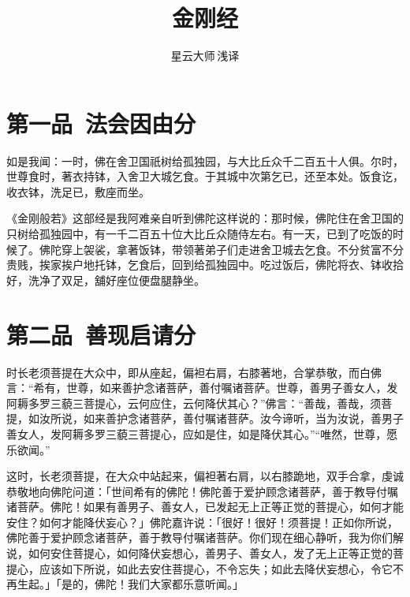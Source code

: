 \documentclass[12pt,twoside,openany]{book}
\title{金刚经}
\author{星云大师\,浅译}
\date{ }
\newcommand{\kai}[1]{{\CJKfamily{kai}#1}}
\begin{document}

\maketitle
\tableofcontents

\noindent
\chapter{第一品\ 法会因由分}

如是我闻：一时，佛在舍卫国祇树给孤独园，与大比丘众千二百五十人俱。尔时，世尊食时，著衣持钵，入舍卫大城乞食。于其城中次第乞已，还至本处。饭食讫，收衣钵，洗足已，敷座而坐。

\kai{《金刚般若》这部经是我阿难亲自听到佛陀这样说的：那时候，佛陀住在舍卫国的只树给孤独园中，有一千二百五十位大比丘众随侍左右。有一天，已到了吃饭的时候了。佛陀穿上袈裟，拿著饭钵，带领著弟子们走进舍卫城去乞食。不分贫富不分贵贱，挨家挨户地托钵，乞食后，回到给孤独园中。吃过饭后，佛陀将衣、钵收拾好，洗净了双足，舖好座位便盘腿静坐。}

\chapter{第二品\ 善现启请分}

时长老须菩提在大众中，即从座起，偏袒右肩，右膝著地，合掌恭敬，而白佛言：“希有，世尊，如来善护念诸菩萨，善付嘱诸菩萨。世尊，善男子善女人，发阿耨多罗三藐三菩提心，云何应住，云何降伏其心？”佛言：“善哉，善哉，须菩提，如汝所说，如来善护念诸菩萨，善付嘱诸菩萨。汝今谛听，当为汝说，善男子善女人，发阿耨多罗三藐三菩提心，应如是住，如是降伏其心。”“唯然，世尊，愿乐欲闻。”

\kai{这时，长老须菩提，在大众中站起来，偏袒著右肩，以右膝跪地，双手合拿，虔诚恭敬地向佛陀问道：「世间希有的佛陀！佛陀善于爱护顾念诸菩萨，善于教导付嘱诸菩萨。佛陀！如果有善男子、善女人，已发起无上正等正觉的菩提心，如何才能安住？如何才能降伏妄心？」佛陀嘉许说：「很好！很好！须菩提！正如你所说，佛陀善于爱护顾念诸菩萨，善于教导付嘱诸菩萨。你们现在细心静听，我为你们解说，如何安住菩提心，如何降伏妄想心，善男子、善女人，发了无上正等正觉的菩提心，应该如下所说，如此去安住菩提心，不令忘失；如此去降伏妄想心，令它不再生起。」「是的，佛陀！我们大家都乐意听闻。」}
\end{document}
